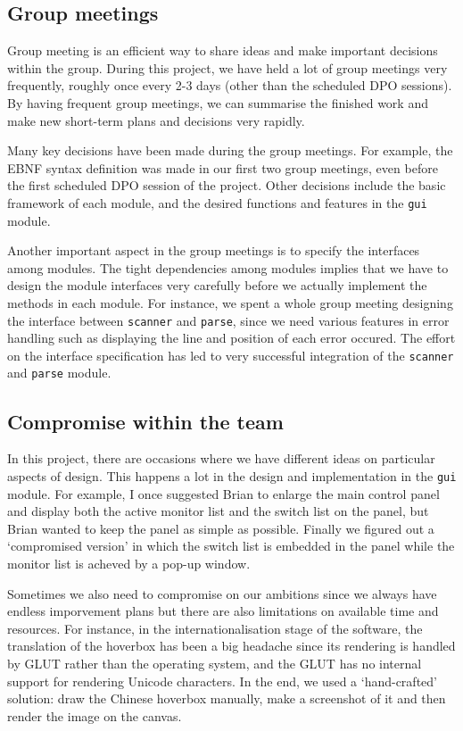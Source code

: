 \documentclass[10pt,a4paper]{article}
\begin{document}
\subsection{Group meetings}
\label{sec:org6d55e23}

Group meeting is an efficient way to share ideas and make important
decisions within the group. During this project, we have held a lot of
group meetings very frequently, roughly once every 2-3 days (other
than the scheduled DPO sessions). By having frequent group meetings,
we can summarise the finished work and make new short-term plans and
decisions very rapidly. 

Many key decisions have been made during the group meetings. For
example, the EBNF syntax definition was made in our first two group
meetings, even before the first scheduled DPO session of the project.
Other decisions include the basic framework of each module, and the
desired functions and features in the \texttt{gui} module.

Another important aspect in the group meetings is to specify the
interfaces among modules. The tight dependencies among modules implies
that we have to design the module interfaces very carefully before we
actually implement the methods in each module. For instance, we spent
a whole group meeting designing the interface between \texttt{scanner} and
\texttt{parse}, since we need various features in error handling such as
displaying the line and position of each error occured. The effort on
the interface specification has led to very successful integration of
the \texttt{scanner} and \texttt{parse} module.

\subsection{Compromise within the team}
\label{sec:orga9e018c}

In this project, there are occasions where we have different ideas on
particular aspects of design. This happens a lot in the design and
implementation in the \texttt{gui} module. For example, I once suggested
Brian to enlarge the main control panel and display both the active
monitor list and the switch list on the panel, but Brian wanted to
keep the panel as simple as possible. Finally we figured out a
`compromised version' in which the switch list is embedded in the
panel while the monitor list is acheved by a pop-up window.

Sometimes we also need to compromise on our ambitions since we always
have endless imporvement plans but there are also limitations on
available time and resources. For instance, in the
internationalisation stage of the software, the translation of the
hoverbox has been a big headache since its rendering is handled by
GLUT rather than the operating system, and the GLUT has no internal
support for rendering Unicode characters. In the end, we used a
`hand-crafted' solution: draw the Chinese hoverbox manually, make a
screenshot of it and then render the image on the canvas.
\end{document}
